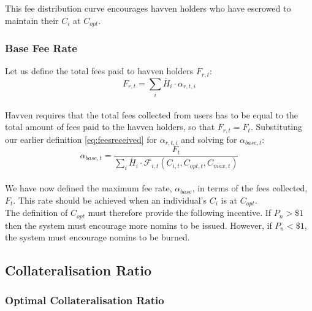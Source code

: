 \noindent This fee distribution curve encourages havven holders who have escrowed to maintain their $C_i$ at $C_{opt}$.  \\

\newpage

\subsubsection{Base Fee Rate}

Let us define the total fees paid to havven holders $F_{r,t}$: \\

\begin{equation}
F_{r,t} = \sum_{i} \check{H_i} \cdot \alpha_{r,t,i} \label{eq:totalfeesreceived}
\end{equation} \\

\noindent Havven requires that the total fees collected from users has to be equal to the total amount of
fees paid to the havven holders, so that $F_{r,t} = F_t$. Substituting our earlier definition \eqref{eq:feesreceived} for $\alpha_{r,t,i}$ and solving for $\alpha_{base,t} $: \\

\begin{equation}
\alpha_{base,t} = \frac{F_t}{\sum_{i} \check{H_i} \cdot \mathcal{F}_{i,t}(C_{i,t}, C_{opt,t}, C_{max,t})} \label{eq:10}
\end{equation} \\

\noindent We have now defined the maximum fee rate, $\alpha_{base}$, in terms of the fees collected, $F_t$. This rate should be achieved when an individual's $C_i$ is at $C_{opt}$. \\

\noindent The definition of $C_{opt}$ must therefore provide the following incentive. If $P_n > \$1$ then the system must encourage more nomins to be issued. However, if $P_n < \$1$, the system must encourage nomins to be burned. 

\newpage

\subsection{Collateralisation Ratio}
\subsubsection{Optimal Collateralisation Ratio}

